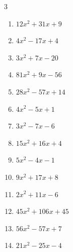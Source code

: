 \begin{multicols}{3}
\begin{enumerate}
        \phantom{$=(3x-2)(2x+3)$}

\columnbreak %

  \item $12x^{2}+31x+9$

        \phantom{$=(4x+9)(3x+1)$}

  \item $4x^{2}-17x+4$

        \phantom{$=(x-4)(4x-1)$}

  \item $3x^{2}+7x-20$

        \phantom{$=(x+4)(3x-5)$}

  \item $81x^{2}+9x-56$

        \phantom{$=(9x+8)(9x-7)$}

  \item $28x^{2}-57x+14$

        \phantom{$=(4x-7)(7x-2)$}

  \item $4x^{2}-5x+1$

        \phantom{$=(x-1)(4x-1)$}

  \item $3x^{2}-7x-6$

        \phantom{$=(x-3)(3x+2)$}

  \item $15x^{2}+16x+4$

        \phantom{$=(3x+2)(5x+2)$}

  \item $5x^{2}-4x-1$

        \phantom{$=(x-1)(5x+1)$}

  \item $9x^{2}+17x+8$

        \phantom{$=(x+1)(9x+8)$}

\columnbreak %

  \item $2x^{2}+11x-6$

        \phantom{$=(x+6)(2x-1)$}

  \item $45x^{2}+106x+45$

        \phantom{$=(9x+5)(5x+9)$}

  \item $56x^{2}-57x+7$

        \phantom{$=(8x-7)(7x-1)$}

  \item $21x^{2}-25x-4$


\end{enumerate}
\end{multicols}
